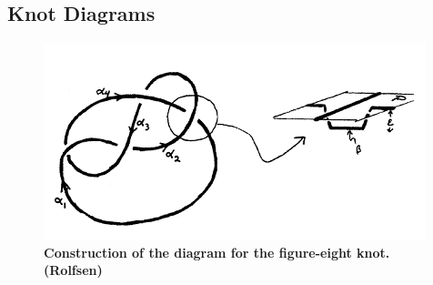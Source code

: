 \documentclass{article}
\begin{document}
\subsection{Knot Diagrams}
\begin{figure}[!htb]
	\begin{center}
	\includegraphics{knotdiagram.png}
	\caption \textbf{Construction of the diagram for the figure-eight knot. (Rolfsen)}
	\end{center}
\end{figure}
\end{document}
